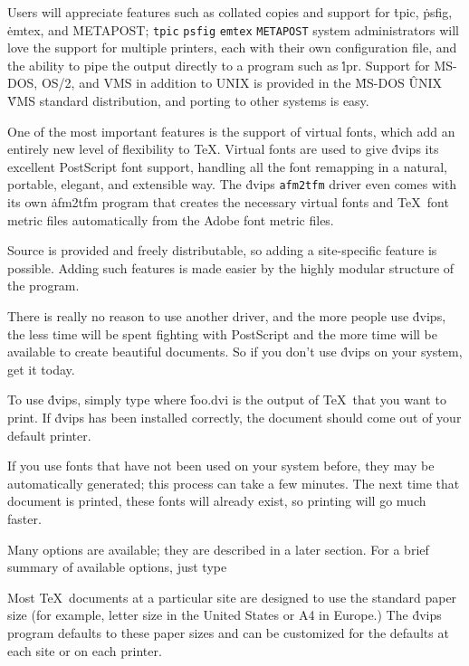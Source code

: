 Users will appreciate features such as collated copies and support
for \.{tpic}, \.{psfig}, \.{emtex}, and \.{METAPOST};
\^{{\tt tpic}}
\^{{\tt psfig}}
\^{{\tt emtex}}
\^{{\tt METAPOST}}
system administrators will love the support for multiple printers, each
with their own configuration file, and the ability to pipe the output
directly to a program such as \.{lpr}.
Support for MS-DOS, OS/2, and VMS in addition to UNIX is provided in the
\^{MS-DOS}
\^{UNIX}
\^{VMS}
standard distribution, and porting to other systems is easy.

One of the most important features is the support of virtual fonts, which
add an entirely new level of flexibility to \TeX.  Virtual fonts are used to
give \.{dvips} its excellent PostScript font support, handling all the font
remapping in a natural, portable, elegant, and extensible way.	The \.{dvips}
\^{{\tt afm2tfm}}
driver even comes with its own \.{afm2tfm} program that creates the necessary
virtual fonts and \TeX\ font metric files automatically from the Adobe
font metric files.

Source is provided and freely distributable, so adding a site-specific feature
is possible.  Adding such features is made easier by the highly modular
structure of the program.

There is really no reason to use another driver, and the more people use
\.{dvips}, the less time will be spent fighting with PostScript and the
more time will be available to create beautiful documents.
So if you don't use \.{dvips} on your system, get it today.


To use \.{dvips}, simply type
\noindent
where \.{foo.dvi} is the output of \TeX\ that you want to print.  If \.{dvips}
has been installed correctly, the document should come out of your default
printer.

If you use fonts that have not been used on your system before, they
may be automatically generated; this process can take a few minutes.
The next time that document is printed, these fonts will already exist, so
printing will go much faster.

Many options are available; they are described in a later section.
For a brief summary of available options, just type


Most \TeX\ documents at a particular site are designed to use the
standard paper size (for example, letter size in the United States
or A4 in Europe.)  The \.{dvips} program defaults to these paper
sizes and can be customized for the defaults at each site or on
each printer.

